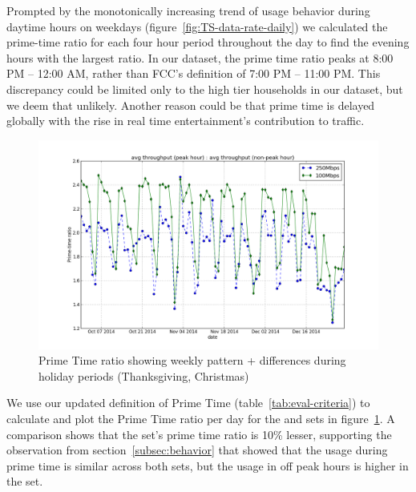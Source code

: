 Prompted by the monotonically increasing trend of usage behavior during daytime hours on
weekdays (figure~\ref{fig:TS-data-rate-daily})
we calculated the prime-time ratio for each four hour period throughout the day
to find the evening hours with the largest ratio.
In our dataset, the prime time ratio peaks at 8:00 PM -- 12:00 AM,
rather than FCC's definition of 7:00 PM -- 11:00 PM. This discrepancy could be limited
only to the high tier households in our dataset, but we deem that unlikely.
Another reason could be that prime time is delayed globally with the rise in real
time entertainment's contribution to traffic.

\begin{figure}[ht!]
\begin{minipage}{\linewidth}
\centering
\includegraphics[width=\linewidth]{figures/prime-time-ratio-by-date[replace].png}
\caption{Prime Time ratio showing weekly pattern + differences during holiday periods (Thanksgiving, Christmas)}
\label{fig:TS-prime-time-ratio}
\end{minipage}
\end{figure}

We use our updated definition of Prime Time (table~\ref{tab:eval-criteria}) to calculate and plot
the Prime Time ratio per day for the \test and \control sets in
figure~\ref{fig:TS-prime-time-ratio}. A comparison shows that
the \test set's prime time ratio is 10\% lesser, supporting the observation from
section~\ref{subsec:behavior} that showed that the usage during prime time is similar
across both sets, but the usage in off peak hours is higher in the \test set.

